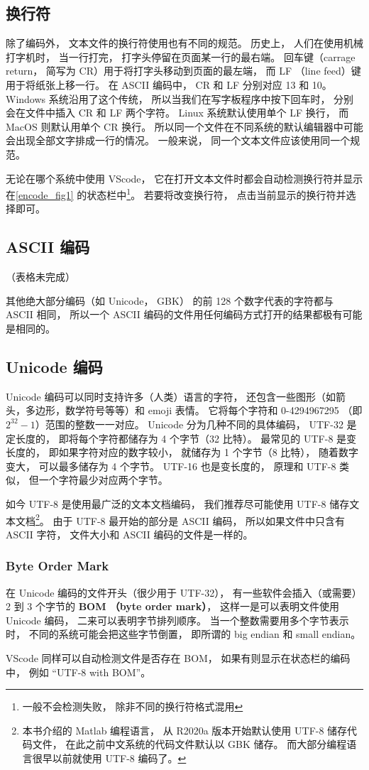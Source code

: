 \subsection{换行符}
除了编码外， 文本文件的换行符使用也有不同的规范。 历史上， 人们在使用机械打字机时， 当一行打完， 打字头停留在页面某一行的最右端。 回车键（carrage return， 简写为 CR）用于将打字头移动到页面的最左端， 而 LF （line feed）键用于将纸张上移一行。 在 ASCII 编码中， CR 和 LF 分别对应 13 和 10。 Windows 系统沿用了这个传统， 所以当我们在写字板程序中按下回车时， 分别会在文件中插入 CR 和 LF 两个字符。 Linux 系统默认使用单个 LF 换行， 而 MacOS 则默认用单个 CR 换行。 所以同一个文件在不同系统的默认编辑器中可能会出现全部文字排成一行的情况。 一般来说， 同一个文本文件应该使用同一个规范。

无论在哪个系统中使用 VScode， 它在打开文本文件时都会自动检测换行符并显示在\autoref{encode_fig1} 的状态栏中\footnote{一般不会检测失败， 除非不同的换行符格式混用}。 若要将改变换行符， 点击当前显示的换行符并选择即可。

\subsection{ASCII 编码}
（表格未完成）

其他绝大部分编码（如 Unicode， GBK） 的前 128 个数字代表的字符都与 ASCII 相同， 所以一个 ASCII 编码的文件用任何编码方式打开的结果都极有可能是相同的。

\subsection{Unicode 编码}
Unicode 编码可以同时支持许多（人类）语言的字符， 还包含一些图形（如箭头，多边形，数学符号等等）和 emoji 表情。 它将每个字符和 0-4294967295 （即 $2^{32}-1$）范围的整数一一对应。 Unicode 分为几种不同的具体编码， UTF-32 是定长度的， 即将每个字符都储存为 4 个字节（32 比特）。 最常见的 UTF-8 是变长度的， 即如果字符对应的数字较小， 就储存为 1 个字节（8 比特）， 随着数字变大， 可以最多储存为 4 个字节。 UTF-16 也是变长度的， 原理和 UTF-8 类似， 但一个字符最少对应两个字节。

如今 UTF-8 是使用最广泛的文本文档编码， 我们推荐尽可能使用 UTF-8 储存文本文档\footnote{本书介绍的 Matlab 编程语言， 从 R2020a 版本开始默认使用 UTF-8 储存代码文件， 在此之前中文系统的代码文件默认以 GBK 储存。 而大部分编程语言很早以前就使用 UTF-8 编码了。}。 由于 UTF-8 最开始的部分是 ASCII 编码， 所以如果文件中只含有 ASCII 字符， 文件大小和 ASCII 编码的文件是一样的。

\subsubsection{Byte Order Mark}
在 Unicode 编码的文件开头（很少用于 UTF-32）， 有一些软件会插入（或需要） 2 到 3 个字节的 \textbf{BOM （byte order mark）}， 这样一是可以表明文件使用 Unicode 编码， 二来可以表明字节排列顺序。 当一个整数需要用多个字节表示时， 不同的系统可能会把这些字节倒置， 即所谓的 big endian 和 small endian。

VScode 同样可以自动检测文件是否存在 BOM， 如果有则显示在状态栏的编码中， 例如 “UTF-8 with BOM”。
